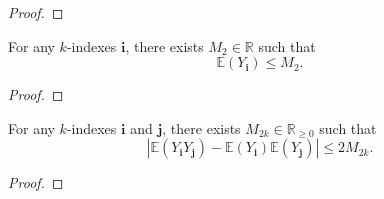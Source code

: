 \begin{proof}
\end{proof}
\begin{lemma}[R-2-16]
  \label{} %
  For any $k$-indexes $\mathbf{i}$, there exists $M_2 \in \mathbb{R}$ such that
  \[
  \mathbb{E} (Y_\mathbf{i}) \leq M_2.
  \]
\end{lemma}
\begin{proof}
\end{proof}
\begin{lemma}[R-2-17]
  \label{} %
  \uses{} %
  For any $k$-indexes $\mathbf{i}$ and $\mathbf{j}$, there exists $M_{2k} \in \mathbb{R}_{\geq 0}$ such that
  \[
  | \mathbb{E} (Y_\mathbf{i}Y_\mathbf{j}) -  \mathbb{E}(Y_\mathbf{i}) \mathbb{E}(Y_\mathbf{j}) |
  \leq 2 M_{2k}.
  \] 
\end{lemma}
\begin{proof}
\end{proof}





\iffalse
\begin{definition}
  \label{}
  \uses{}%

\end{definition}
\begin{lemma}
  \label{}
  \uses{}
\end{lemma}
\begin{proof}
\end{proof}
\fi






